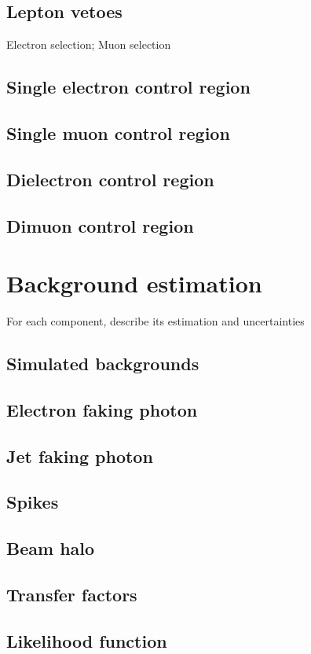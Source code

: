 \documentclass[oneside, letterpaper, 12pt, oldfontcommands]{memoir}
\begin{document}
\section{Lepton vetoes}
Electron selection; Muon selection
\section{Single electron control region}
\section{Single muon control region}
\section{Dielectron control region}
\section{Dimuon control region}

\chapter{Background estimation}
For each component, describe its estimation and uncertainties
\section{Simulated backgrounds}
\section{Electron faking photon}
\section{Jet faking photon}
\section{Spikes}
\section{Beam halo}
\section{Transfer factors}
\section{Likelihood function}
\end{document}
